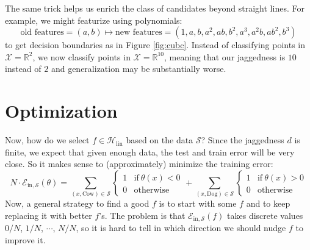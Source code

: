 \documentclass[openany, notitlepage, justified]{tufte-book}
\newcommand{\RR}{\mathbb{R}}
\newcommand{\Ee}{\mathcal{E}}
\newcommand{\Hh}{\mathcal{H}}
\newcommand{\Ss}{\mathcal{S}}
\newcommand{\Xx}{\mathcal{X}}
\newcommand{\Ein}{\Ee_{\text{in},\Ss}}
\begin{document}
            The same trick helps us enrich the class of candidates beyond
            straight lines.  For example, we might featurize using
            polynomials: 
            $$
                \text{old features} = (a, b)
                \mapsto
                \text{new features} = (1, a, b, a^2, ab, b^2, a^3, a^2b, ab^2, b^3)
            $$
            to get decision boundaries as in Figure \ref{fig:cubc}.
            Instead of classifying points in $\Xx=\RR^2$, we
            now classify points in $\Xx=\RR^{10}$, meaning that our jaggedness
            is $10$ instead of $2$ and generalization may be substantially
            worse.



            \newpage
        \section{Optimization}
            Now, how do we select $f\in \Hh_{\text{lin}}$ based on the data
            $\Ss$?  Since the jaggedness $d$ is finite, we expect that given
            enough data, the test and train error will be very close.  So it
            makes sense to (approximately) minimize the training error:
            $$
                N \cdot \Ein(\theta) =
                    \sum_{(x,\text{Cow})\in \Ss}
                    \begin{cases} 
                        1       &       \text{if}~\theta(x) < 0 \\
                        0       &       \text{otherwise}
                    \end{cases}
                    + 
                    \sum_{(x,\text{Dog})\in \Ss}
                    \begin{cases} 
                        1       &       \text{if}~\theta(x) > 0 \\
                        0       &       \text{otherwise}
                    \end{cases}
            $$
            Now, a general strategy to find a good $f$ is to start with some
            $f$ and to keep replacing it with better $f$'s.
            The problem is that $\Ein(f)$ takes discrete values $0/N$, $1/N$,
            $\cdots$, $N/N$, so it is hard to tell in which direction we should
            nudge $f$ to improve it.
\end{document}
